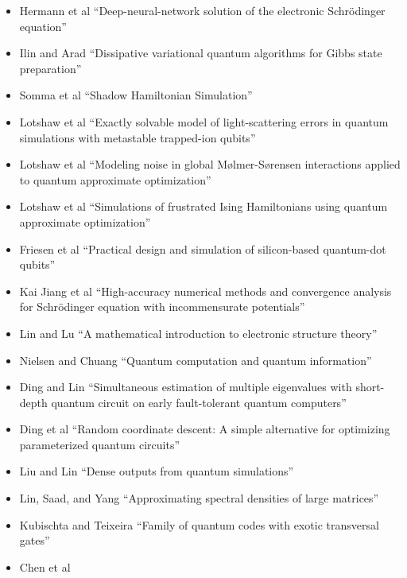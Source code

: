 \documentclass[]{article}
\begin{document}
\begin{itemize}
``Single-Electron Qubits Based on Quantum Ring States on Solid Neon Surface''
\item
Hermann et al\cite{hermann2020deep}
``Deep-neural-network solution of the electronic Schr{\"o}dinger equation''
\item
Ilin and Arad\cite{ilin2024dissipativevariationalquantumalgorithms}
``Dissipative variational quantum algorithms for Gibbs state preparation''
\item
Somma et al\cite{somma2024shadowhamiltoniansimulation}
``Shadow Hamiltonian Simulation''
\item 
Lotshaw et al\cite{PhysRevA.110.L030803}
``Exactly solvable model of light-scattering errors in quantum simulations with metastable trapped-ion qubits''
\item
Lotshaw et al\cite{PhysRevA.107.062406}
``Modeling noise in global M\o{}lmer-S\o{}rensen interactions applied to quantum approximate optimization''
\item
Lotshaw et al\cite{doi:10.1098/rsta.2021.0414} ``Simulations of frustrated Ising Hamiltonians using quantum approximate optimization''
\item Friesen et al\cite{PhysRevB.67.121301}
  ``Practical design and simulation of silicon-based quantum-dot qubits''
\item Kai Jiang et al\cite{jiang2024high}
``High-accuracy numerical methods and convergence analysis for Schr{\"o}dinger equation with incommensurate potentials''
\item Lin and Lu\cite{lin2019mathematical}
``A mathematical introduction to electronic structure theory''
\item Nielsen and Chuang\cite{nielsen2010quantum}
``Quantum computation and quantum information''
\item Ding and Lin\cite{ding2023simultaneous}
``Simultaneous estimation of multiple eigenvalues with short-depth quantum circuit on early fault-tolerant quantum computers''
\item Ding et al\cite{ding2024random}
  ``Random coordinate descent: A simple alternative for optimizing parameterized quantum circuits''
\item Liu and Lin\cite{LIU2024113213}
``Dense outputs from quantum simulations''
\item Lin, Saad, and Yang\cite{lin2016approximating}
``Approximating spectral densities of large matrices''
\item Kubischta and Teixeira\cite{kubischta2023family}
``Family of quantum codes with exotic transversal gates''
\item Chen et al\cite{10628380}

\end{itemize}
\end{document}
